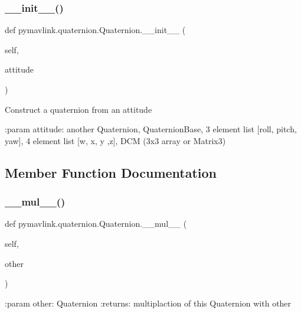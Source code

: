 \subsubsection{\texorpdfstring{\+\_\+\+\_\+init\+\_\+\+\_\+()}{\_\_init\_\_()}}
{\footnotesize\ttfamily def pymavlink.\+quaternion.\+Quaternion.\+\_\+\+\_\+init\+\_\+\+\_\+ (\begin{DoxyParamCaption}\item[{}]{self,  }\item[{}]{attitude }\end{DoxyParamCaption})}

\begin{DoxyVerb}Construct a quaternion from an attitude

:param attitude: another Quaternion, QuaternionBase,
    3 element list [roll, pitch, yaw],
    4 element list [w, x, y ,z], DCM (3x3 array or Matrix3)
\end{DoxyVerb}
 

\subsection{Member Function Documentation}
\mbox{\label{classpymavlink_1_1quaternion_1_1Quaternion_af3d7ea873b5cc8bea69d2664b8e6dcc9}} 
\subsubsection{\texorpdfstring{\+\_\+\+\_\+mul\+\_\+\+\_\+()}{\_\_mul\_\_()}}
{\footnotesize\ttfamily def pymavlink.\+quaternion.\+Quaternion.\+\_\+\+\_\+mul\+\_\+\+\_\+ (\begin{DoxyParamCaption}\item[{}]{self,  }\item[{}]{other }\end{DoxyParamCaption})}

\begin{DoxyVerb}:param other: Quaternion
:returns: multiplaction of this Quaternion with other
\end{DoxyVerb}
 \mbox{\label{classpymavlink_1_1quaternion_1_1Quaternion_a768c82f6b6fbb4e9c3a496e494a0c587}} 
